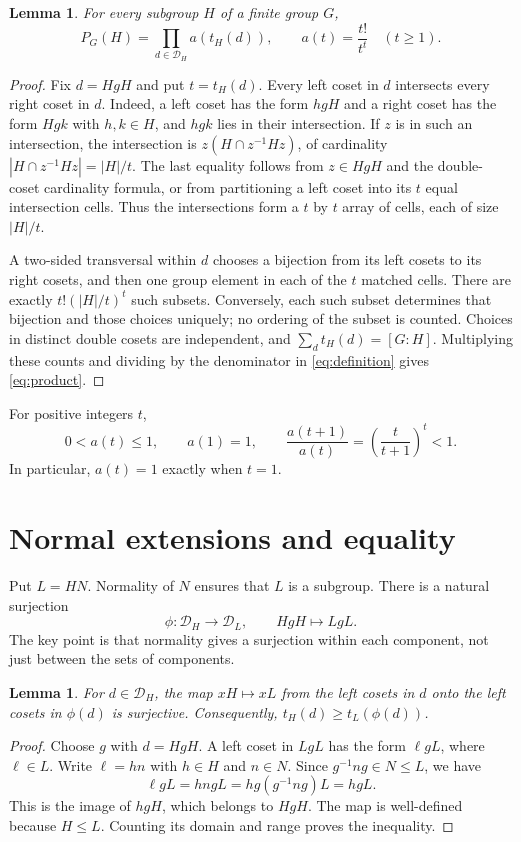 \documentclass[11pt]{article}
\newtheorem{lemma}[theorem]{Lemma}
\newcommand{\PP}{P}
\newcommand{\DD}{\mathcal D}
\begin{document}
\begin{lemma}\label{lem:count}
For every subgroup $H$ of a finite group $G$,
\begin{equation}\label{eq:product}
 \PP_G(H)=\prod_{d\in\DD_H}a(t_H(d)),\qquad
 a(t)=\frac{t!}{t^t}\quad(t\geq1).
\end{equation}
\end{lemma}
\begin{proof}
Fix $d=HgH$ and put $t=t_H(d)$. Every left coset in $d$ intersects every
right coset in $d$. Indeed, a left coset has the form $hgH$ and a right coset
has the form $Hgk$ with $h,k\in H$, and $hgk$ lies in their intersection.
If $z$ is in such an intersection, the intersection is
$z(H\cap z^{-1}Hz)$, of cardinality $|H\cap z^{-1}Hz|=|H|/t$.
The last equality follows from $z\in HgH$ and the double-coset cardinality
formula, or from partitioning a left coset into its $t$ equal intersection
cells. Thus the intersections form a $t$ by $t$ array of cells, each of size
$|H|/t$.

A two-sided transversal within $d$ chooses a bijection from its left cosets
to its right cosets, and then one group element in each of the $t$ matched
cells. There are exactly $t!(|H|/t)^t$ such subsets. Conversely, each such
subset determines that bijection and those choices uniquely; no ordering of
the subset is counted. Choices in distinct double cosets are independent,
and $\sum_d t_H(d)=[G:H]$. Multiplying these counts and dividing by the
denominator in \eqref{eq:definition} gives \eqref{eq:product}.
\end{proof}

For positive integers $t$,
\begin{equation}\label{eq:weights}
 0<a(t)\leq1,\qquad a(1)=1,\qquad
 \frac{a(t+1)}{a(t)}=\left(\frac{t}{t+1}\right)^t<1.
\end{equation}
In particular, $a(t)=1$ exactly when $t=1$.

\section{Normal extensions and equality}
Put $L=HN$. Normality of $N$ ensures that $L$ is a subgroup. There is a
natural surjection
\[
 \phi:\DD_H\longrightarrow\DD_L,\qquad HgH\longmapsto LgL.
\]
The key point is that normality gives a surjection within each component,
not just between the sets of components.

\begin{lemma}\label{lem:orbit}
For $d\in\DD_H$, the map $xH\mapsto xL$ from the left cosets in $d$ onto
the left cosets in $\phi(d)$ is surjective. Consequently,
$t_H(d)\geq t_L(\phi(d))$.
\end{lemma}
\begin{proof}
Choose $g$ with $d=HgH$. A left coset in $LgL$ has the form $\ell gL$,
where $\ell\in L$. Write $\ell=hn$ with $h\in H$ and $n\in N$. Since
$g^{-1}ng\in N\leq L$, we have
\[
 \ell gL=hngL=hg(g^{-1}ng)L=hgL.
\]
This is the image of $hgH$, which belongs to $HgH$. The map is well-defined
because $H\leq L$. Counting its domain and range proves the inequality.
\end{proof}
\end{document}
